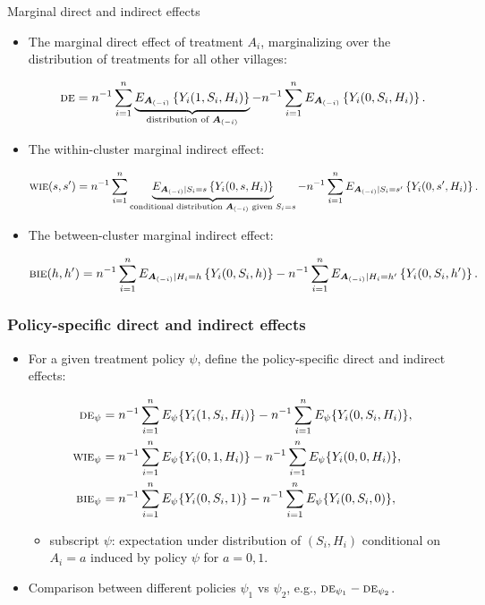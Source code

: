 \documentclass[aspectratio=169]{beamer}
\newcommand{\bA}{\boldsymbol{A}}
\newcommand{\sumi}{\sum_{i=1}^n}
\newcommand{\de}{\textsc{de}}
\newcommand{\bie}{\textsc{bie}}
\newcommand{\wie}{\textsc{wie}}
\begin{document}
\begin{frame}{Marginal direct and indirect effects}
\begin{itemize}
    \item The marginal direct effect of treatment $A_{i}$, marginalizing over the distribution of treatments for all other villages:
    \begin{small}
    \[
    \de = n^{-1}\sumi \underbrace{E_{\bA_{(-i)}}\left\{Y_{i}(1,S_{i},H_{i})\right\}}_{\textup{distribution of }\bA_{(-i)}} - n^{-1}\sumi E_{\bA_{(-i)}}\left\{Y_{i}(0,S_{i},H_{i})\right\}.
    \]
    \end{small}
    \pause
    \item The within-cluster marginal indirect effect:
    \begin{small}
    \[
    \wie(s,s^{\prime}) = n^{-1}\sumi \underbrace{E_{\bA_{(-i)}\mid S_{i} = s}\left\{Y_{i}(0,s,H_{i})\right\}}_{\textup{conditional distribution }\bA_{(-i)}\textup{ given }S_{i}=s} - n^{-1}\sumi E_{\bA_{(-i)}\mid S_{i} = s^{\prime}}\left\{Y_{i}(0,s^{\prime},H_{i})\right\}.
    \]
    \end{small}
    \pause
    \item The between-cluster marginal indirect effect:
    \begin{small}
    \[
    \bie(h,h^{\prime}) = n^{-1}\sumi E_{\bA_{(-i)}\mid H_{i} = h}\left\{Y_{i}(0,S_{i},h)\right\} - n^{-1}\sumi E_{\bA_{(-i)}\mid H_{i} = h^{\prime}}\left\{Y_{i}(0,S_{i},h^{\prime})\right\}.
    \] 
    \end{small}
\end{itemize}
\end{frame}


\begin{frame}
\frametitle{Policy-specific direct and indirect effects}
\begin{itemize}
    \item For a given treatment policy $\psi$, define the policy-specific direct and indirect effects:
    \begin{small}
    \begin{align*}
    \de_\psi &= n^{-1}\sumi E_\psi\{Y_i(1,S_i,H_i)\} - n^{-1}\sumi E_\psi\{Y_i(0,S_i,H_i)\}, \\
    \wie_\psi &= n^{-1}\sumi E_\psi\{Y_i(0,1,H_i)\} - n^{-1}\sumi E_\psi\{Y_i(0,0,H_i)\}, \\
    \bie_\psi &= n^{-1}\sumi E_\psi\{Y_i(0,S_i,1)\} - n^{-1}\sumi E_\psi\{Y_i(0,S_i,0)\},
    \end{align*}
    \end{small}
    \begin{itemize}
        \item subscript $\psi$: expectation under distribution of $(S_{i}, H_{i})$ conditional on $A_{i} = a$ induced by policy $\psi$ for $a=0,1$.
    \end{itemize}
    \item Comparison between different policies $\psi_1$ vs $\psi_2$, e.g., $\de_{\psi_1} - \de_{\psi_2}$.
\end{itemize}
\end{frame}
\end{document}
